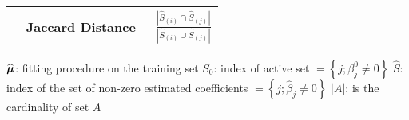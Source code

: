 \begin{table}[h]
\begin{threeparttable}
\begin{tabulary}{\linewidth}{lc}
\addlinespace[10pt] 
\,\,\,\, Jaccard Distance~\citep{jaccard1912distribution} & $\frac{|\widehat{S}_{(i)} \cap \widehat{S}_{(j)} |}{ |\widehat{S}_{(i)} \cup \widehat{S}_{(j)} |}$  \\ \bottomrule
		\end{tabulary}
		\begin{tablenotes}
			{\footnotesize
			$\widehat{\boldsymbol{\mu}}$: fitting procedure on the training set
			$S_0$: index of active set $ = \left\lbrace j; \beta_j^0 \neq 0 \right\rbrace$
			$\widehat{S}$: index of the set of non-zero estimated coefficients $ = \left\lbrace j; \widehat{\beta}_j \neq 0 \right\rbrace$
		    $|A|$: is the cardinality of set $A$				
			}
		\end{tablenotes} 		
	\end{threeparttable}
\end{table}	